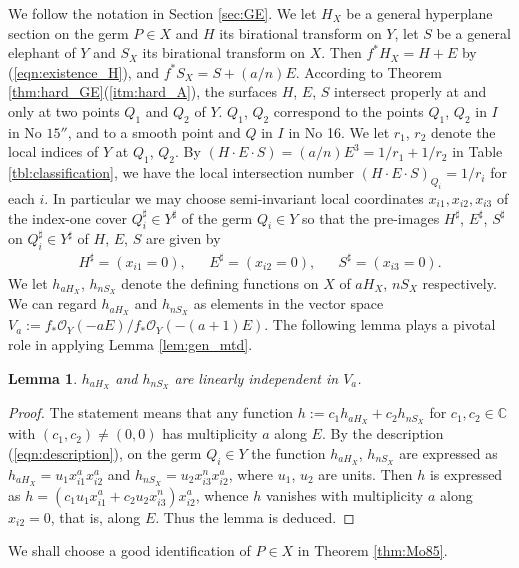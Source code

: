 \documentclass[a4paper,11pt]{amsart}
\newtheorem{lemma}[theorem]{Lemma}
\theoremstyle{definition}
\theoremstyle{remark}
\numberwithin{equation}{section}
\newcommand{\bC}{{\mathbb C}}
\newcommand{\cO}{{\mathcal O}}
\begin{document}
We follow the notation in Section \ref{sec:GE}.
We let $H_X$ be a general hyperplane section on the germ $P \in X$
and $H$ its birational transform on $Y$,
let $S$ be a general elephant of $Y$ and
$S_X$ its birational transform on $X$.
Then $f^*H_X=H+E$ by (\ref{eqn:existence_H}),
and $f^*S_X=S+(a/n)E$.
According to Theorem \ref{thm:hard_GE}(\ref{itm:hard_A}),
the surfaces $H$, $E$, $S$ intersect properly at and only at two points
$Q_1$ and $Q_2$ of $Y$.
$Q_1$, $Q_2$ correspond
to the points $Q_1$, $Q_2$ in $I$ in No $\textrm{15}''$,
and to a smooth point and $Q$ in $I$ in No 16.
We let $r_1$, $r_2$ denote the local indices of $Y$ at $Q_1$, $Q_2$.
By $(H\cdot E\cdot S)=(a/n)E^3=1/r_1+1/r_2$ in Table \ref{tbl:classification},
we have the local intersection number $(H\cdot E\cdot S)_{Q_i}=1/r_i$
for each $i$.
In particular we may choose semi-invariant local coordinates
$x_{i1},x_{i2},x_{i3}$ of the index-one cover $Q_i^\sharp \in Y^\sharp$
of the germ $Q_i \in Y$ so that
the pre-images $H^\sharp$, $E^\sharp$, $S^\sharp$ on $Q_i^\sharp \in Y^\sharp$
of $H$, $E$, $S$ are given by
\begin{align}\label{eqn:description}
H^\sharp=(x_{i1}=0), && E^\sharp=(x_{i2}=0), && S^\sharp=(x_{i3}=0).
\end{align}
We let $h_{aH_X}$, $h_{nS_X}$ denote the defining functions on $X$
of $aH_X$, $nS_X$ respectively.
We can regard $h_{aH_X}$ and $h_{nS_X}$ as elements
in the vector space $V_a:=f_*\cO_Y(-aE)/f_*\cO_Y(-(a+1)E)$.
The following lemma plays a pivotal role in applying Lemma \ref{lem:gen_mtd}.

\begin{lemma}\label{lem:pivotal}
$h_{aH_X}$ and $h_{nS_X}$ are linearly independent in $V_a$.
\end{lemma}

\begin{proof}
The statement means that
any function $h:=c_1h_{aH_X}+c_2h_{nS_X}$
for $c_1,c_2\in\bC$ with $(c_1,c_2)\neq(0,0)$ has multiplicity $a$ along $E$.
By the description (\ref{eqn:description}),
on the germ $Q_i \in Y$
the function $h_{aH_X}$, $h_{nS_X}$ are expressed as
$h_{aH_X}=u_1x_{i1}^ax_{i2}^a$ and $h_{nS_X}=u_2x_{i3}^nx_{i2}^a$,
where $u_1$, $u_2$ are units.
Then $h$ is expressed as $h=(c_1u_1x_{i1}^a+c_2u_2x_{i3}^n)x_{i2}^a$,
whence $h$ vanishes with multiplicity $a$ along $x_{i2}=0$,
that is, along $E$.
Thus the lemma is deduced.
\end{proof}

We shall choose a good identification of $P \in X$ in Theorem \ref{thm:Mo85}.
\end{document}
